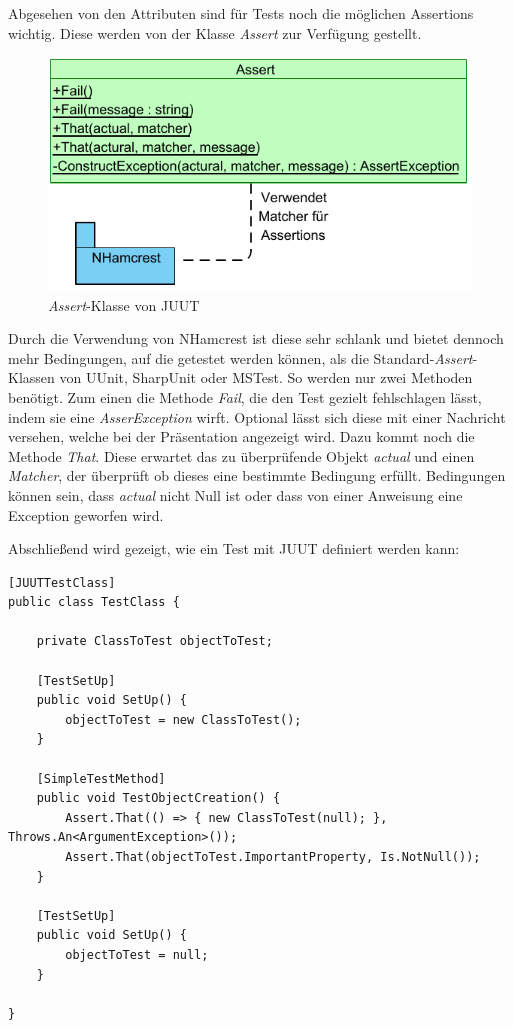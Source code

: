 Abgesehen von den Attributen sind für Tests noch die möglichen Assertions wichtig. Diese werden von der Klasse \textit{Assert} zur Verfügung gestellt.
\begin{figure}
\centering
\includegraphics[width=0.95\linewidth]{images/Kapitel_Ergebnis/Assert}
\caption[\textit{Assert}-Klasse von JUUT]{\textit{Assert}-Klasse von JUUT}
\label{fig:Assert}
\end{figure}
Durch die Verwendung von NHamcrest ist diese sehr schlank und bietet dennoch mehr Bedingungen, auf die getestet werden können, als die Standard-\textit{Assert}-Klassen von UUnit, SharpUnit oder MSTest. So werden nur zwei Methoden benötigt. Zum einen die Methode \textit{Fail}, die den Test gezielt fehlschlagen lässt, indem sie eine \textit{AsserException} wirft. Optional lässt sich diese mit einer Nachricht versehen, welche bei der Präsentation angezeigt wird. Dazu kommt noch die Methode \textit{That}. Diese erwartet das zu überprüfende Objekt \textit{actual} und einen \textit{Matcher}, der überprüft ob dieses eine bestimmte Bedingung erfüllt. Bedingungen können sein, dass \textit{actual} nicht Null ist oder dass von einer Anweisung eine Exception geworfen wird.

Abschließend wird gezeigt, wie ein Test mit JUUT definiert werden kann:
\begin{lstlisting}[caption={[Beispiel für einen Test mit JUUT]Beispiel für einen Test mit JUUT\\In diesem Fall sind \textit{Throws.An} und \textit{Is.NotNull} die Matcher, welche den ersten Parameter darauf überprüfen, dass eine Exception geworfen wird beziehungsweise das Objekt nicht Null ist.}, label=code:SimpleTestMethodAttribute_Validate]
[JUUTTestClass]
public class TestClass {
	
	private ClassToTest objectToTest;
	
	[TestSetUp]
	public void SetUp() {
		objectToTest = new ClassToTest();
	}
	
	[SimpleTestMethod]
	public void TestObjectCreation() {
		Assert.That(() => { new ClassToTest(null); }, Throws.An<ArgumentException>());
		Assert.That(objectToTest.ImportantProperty, Is.NotNull());
	}
		
	[TestSetUp]
	public void SetUp() {
		objectToTest = null;
	}
	
}
\end{lstlisting}
\clearpage

